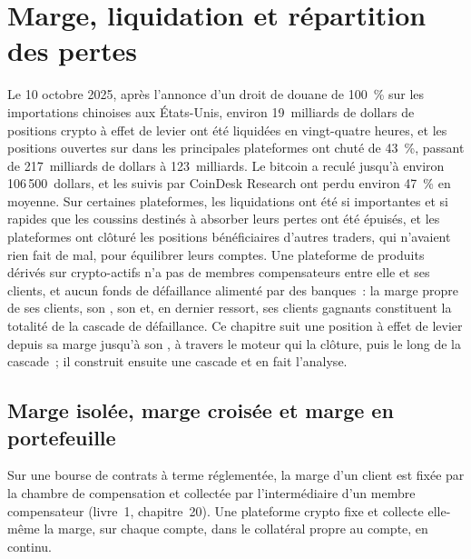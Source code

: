 \chapter{Marge, liquidation et répartition des pertes}\label{ch:m3:margin-liquidation-and-loss-allocation}

Le 10 octobre 2025, après l'annonce d'un droit de douane de 100~\% sur les importations chinoises aux États-Unis,
environ 19~milliards de dollars de positions crypto à effet de levier ont été liquidées en vingt-quatre heures, et les positions ouvertes
sur  dans les principales plateformes ont chuté de 43~\%, passant de 217~milliards de dollars à 123~milliards. Le bitcoin a reculé
jusqu'à environ 106\,500~dollars, et les  suivis par CoinDesk Research ont perdu environ 47~\% en moyenne. Sur certaines plateformes, les
liquidations ont été si importantes et si rapides que les coussins destinés à absorber leurs pertes ont été épuisés, et les
plateformes ont clôturé les positions bénéficiaires d'autres traders, qui n'avaient rien fait de mal, pour équilibrer leurs comptes.
Une plateforme de produits dérivés sur crypto-actifs n'a pas de membres compensateurs entre elle et ses clients, et aucun
fonds de défaillance alimenté par des banques~: la marge propre de ses clients, son , son  et, en dernier
ressort, ses clients gagnants constituent la totalité de la cascade de défaillance. Ce chapitre suit une position à effet de levier
depuis sa marge jusqu'à son , à travers le moteur qui la clôture, puis le long de la cascade~; il construit ensuite
une cascade et en fait l'analyse.

\section{Marge isolée, marge croisée et marge en portefeuille}

Sur une bourse de contrats à terme réglementée, la marge d'un client est fixée par la chambre de compensation et collectée par
l'intermédiaire d'un membre compensateur (livre~1, chapitre~20). Une plateforme crypto fixe et collecte elle-même la marge, sur
chaque compte, dans le collatéral propre au compte, en continu.

